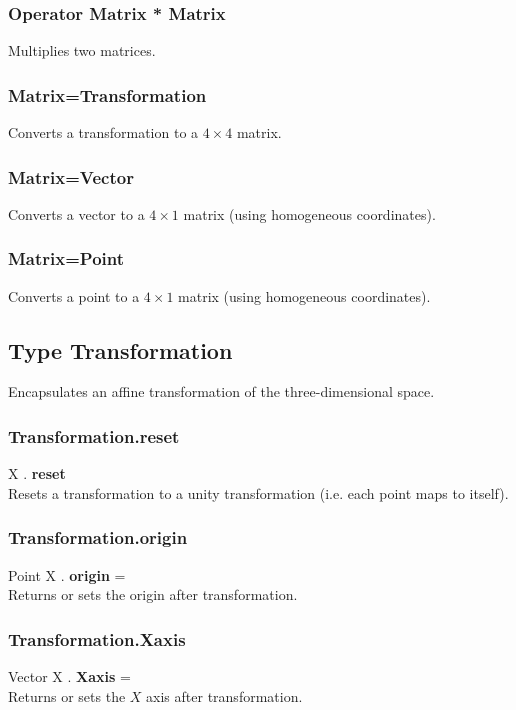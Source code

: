 \documentclass[10pt]{book}
\begin{document}
\subsubsection{Operator Matrix * Matrix \label{O:Matrix*Matrix}}
Multiplies two matrices.

\subsubsection{Matrix=Transformation \label{C:Matrix=Transformation}}
Converts a transformation to a $4 \times 4$ matrix.

\subsubsection{Matrix=Vector \label{C:Matrix=Vector}}
Converts a vector to a $4 \times 1$ matrix (using homogeneous coordinates).

\subsubsection{Matrix=Point \label{C:Matrix=Point}}
Converts a point to a $4 \times 1$ matrix (using homogeneous coordinates).


\subsection{Type Transformation \label{T:Transformation}}
Encapsulates an affine transformation of the three-dimensional space.

\subsubsection{Transformation.reset \label{F:Transformation:reset}}
X . \textbf{reset} \\
Resets a transformation to a unity transformation (i.e. each point maps to itself).

\subsubsection{Transformation.origin \label{F:Transformation:origin}}
Point X . \textbf{origin} = \\
Returns or sets the origin after transformation.

\subsubsection{Transformation.Xaxis \label{F:Transformation:Xaxis}}
Vector X . \textbf{Xaxis} = \\
Returns or sets the $X$ axis after transformation.
\end{document}
